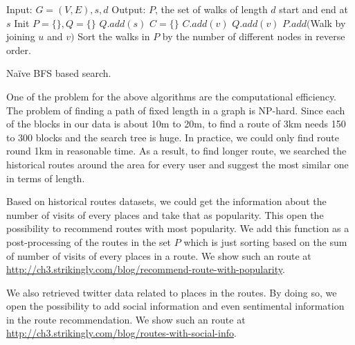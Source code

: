 \begin{algorithm}[H]
\begin{algorithmic}[1]
\STATE Input: $G=(V,E), s, d$
\STATE Output: $P$, the set of walks of length $d$ start and end at $s$
\STATE Init $P=\{\}, Q=\{\}$
\STATE $Q.add(s)$
\STATE $C=\{\}$
\STATE $C.add(v)$
\STATE $Q.add(v)$
\ENDIF
\ENDFOR
\ENDFOR
{}
\STATE $P.add($Walk by joining $u$ and $v)$
\ENDIF
\ENDFOR
\ENDFOR
\ENDWHILE
\STATE Sort the walks in $P$ by the number of different nodes in reverse order.
\end{algorithmic}
\caption{Na\"ive BFS based search.}
\label{alg:bfs2}
\end{algorithm}

One of the problem for the above algorithms are the computational efficiency. The problem of finding a path
of fixed length in a graph is NP-hard. Since each of the blocks in our data is about 10m to 20m, to find a 
route of 3km needs 150 to 300 blocks and the search tree is huge. In practice, we could only find route
round 1km in reasonable time. As a result, to find longer route, we searched the historical routes around 
the area for every user and suggest the most similar one in terms of length.

Based on historical routes datasets, we could get the information about the number of visits of
every places and take that as popularity. This open the possibility to recommend routes with most
popularity. We add this function as a post-processing of the routes in the set $P$ which is just sorting
based on the sum of number of visits of every places in a route. We show such an route at
\url{http://ch3.strikingly.com/blog/recommend-route-with-popularity}.

We also retrieved twitter data related to places in the routes. By doing so, we open the possibility to add
social information and even sentimental information in the route recommendation. We show such an route
at \url{http://ch3.strikingly.com/blog/routes-with-social-info}.














